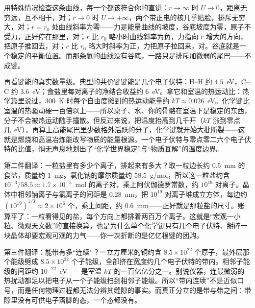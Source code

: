 用特殊情况检查这条曲线，每一个都该符合你的直觉：\(r\to\infty\) 时 \(U\to 0\)，距离无穷远，互不相干，对；\(r\to 0\) 时 \(U\to+\infty\)，两个带正电的核几乎贴脸，排斥无穷大，对；\(r=r_0\) 处曲线斜率为零——力是能量曲线的坡度，谷底坡度为零，原子不受力，正好停在那里，对；\(r\) 比 \(r_0\) 略小时曲线斜率为负，力指向 \(r\) 增大的方向，把原子推回去，对；\(r\) 比 \(r_0\) 略大时斜率为正，力把原子拉回来，对。谷底就是一个稳定的平衡位置。而那条氦的曲线没有谷底，一路只是排斥加微弱的尾巴——不成键。

再看键能的真实数量级。典型的共价键键能是几个电子伏特：H--H 约 \(4.5\)~eV，C--C 约 \(3.6\)~eV；食盐里每对离子的净结合收益约 \(6\)~eV。拿它和室温的热运动比：热学篇里说过，\(300\)~K 时每个自由度摊到的热运动能量约 \(kT\approx0.026\)~eV。化学键比室温的热骚动硬一百倍以上——所以桌子、水、你的骨骼在室温下是稳定的东西，分子不会被热运动随手撞散。但反过来说，把温度抬高到几千开（\(kT\) 涨到零点几~eV），再算上高能尾巴里少数格外活跃的分子，化学键就开始大批断裂——这就是燃烧和高温冶炼能改写物质的能量根源。一个电子伏特与零点零二六个电子伏特的比值，悄无声息地划出了“化学世界稳定”与“物质瓦解”的温度边界。

第二件翻译：一粒盐里有多少个离子，排起来有多大？取一粒边长约 \(0.5\)~mm 的食盐，质量约 \(1\)~mg。氯化钠的摩尔质量约 \(58.5\)~g/mol，所以这一粒盐约含 \(10^{-3}/58.5\approx1.7\times10^{-5}\)~mol 的离子对，乘上阿伏伽德罗常数，约 \(10^{19}\) 对离子。晶体中相邻钠离子与氯离子的间距是 \(0.28\)~nm，把 \(10^{19}\) 对离子堆成立方体，每边约 \((10^{19})^{1/3}\approx2\times10^{6}\) 个，乘上间距，约 \(0.6\)~mm——正好就是那粒盐的尺寸。账算平了：一粒看得见的盐，每个方向上都排着两百万个离子。这就是“宏观一小粒、微观天文数”的直接换算，也是为什么单个化学键只有几个电子伏特、掰碎一块晶体却要宏观可观的力气——你一次折断的是亿亿根键的团购。

第三件翻译：能带有多“连续”？一立方厘米的铜约含 \(8.5\times10^{22}\) 个原子，最外层那个能级劈成 \(8.5\times10^{22}\) 个子能级，全部挤在宽度约几个电子伏特的带内。相邻子能级的间距约 \(10^{-22}\)~eV——是室温 \(kT\) 的一百亿亿分之一。别说仪器，连最微弱的热扰动都足以把电子从一个子能级扫到相邻子能级。所以“带内连续”不是近似口号，而是任何物理过程都无法分辨其缝隙的事实。而真正分立的是带与带之间：带隙里没有可供电子落脚的态，一个态都没有。

\begin{figure}[htbp]
\centering
{}
\end{figure}

